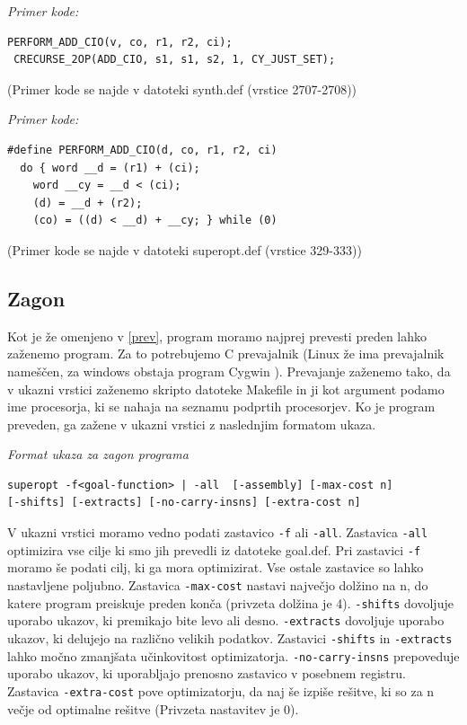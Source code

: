 \documentclass[a4paper, 12pt]{book}
\begin{document}
				\medskip
				
				\noindent
				{\it Primer kode:}
				\begin{Verbatim}[baselinestretch=1]
 PERFORM_ADD_CIO(v, co, r1, r2, ci);
 CRECURSE_2OP(ADD_CIO, s1, s1, s2, 1, CY_JUST_SET);
				\end{Verbatim}
				\noindent
				{\small (Primer kode se najde v datoteki synth.def (vrstice 2707-2708))}
				\medskip
				
				\noindent
{\it Primer kode:}
\begin{Verbatim}[baselinestretch=1]
#define PERFORM_ADD_CIO(d, co, r1, r2, ci) 
  do { word __d = (r1) + (ci);                                          
    word __cy = __d < (ci);                                          
    (d) = __d + (r2);                                                
    (co) = ((d) < __d) + __cy; } while (0)
\end{Verbatim}
%
\noindent
{\small (Primer kode se najde v datoteki superopt.def (vrstice 329-333))}
	 
	\subsection{Zagon}
	Kot je že omenjeno v \ref{prev}, program moramo najprej prevesti preden lahko zaženemo program. Za to potrebujemo C prevajalnik (Linux že ima prevajalnik nameščen, za windows obstaja program Cygwin \cite{cygwin}). Prevajanje zaženemo tako, da v  ukazni vrstici zaženemo skripto datoteke Makefile in ji kot argument podamo ime procesorja, ki se nahaja na seznamu podprtih procesorjev. Ko je program preveden, ga zažene v ukazni vrstici z naslednjim formatom ukaza.
	\medskip
	
	\noindent
	{\it Format ukaza za zagon programa}
\begin{Verbatim}[baselinestretch=1]
superopt -f<goal-function> | -all  [-assembly] [-max-cost n]
[-shifts] [-extracts] [-no-carry-insns] [-extra-cost n]
\end{Verbatim}

	V ukazni vrstici moramo vedno podati zastavico \texttt{-f} ali \texttt{-all}. Zastavica \texttt{-all} optimizira vse cilje ki smo jih prevedli iz datoteke goal.def. Pri zastavici \texttt{-f} moramo še podati cilj, ki ga mora optimizirat. Vse ostale zastavice so lahko nastavljene poljubno. Zastavica \texttt{-max-cost} nastavi največjo dolžino na n, do katere program preiskuje preden konča (privzeta dolžina je 4). \texttt{-shifts} dovoljuje uporabo ukazov, ki premikajo bite levo ali desno. \texttt{-extracts} dovoljuje uporabo ukazov, ki delujejo na različno velikih podatkov. Zastavici \texttt{-shifts} in \texttt{-extracts} lahko močno zmanjšata učinkovitost optimizatorja. \texttt{-no-carry-insns} prepoveduje uporabo ukazov, ki uporabljajo prenosno zastavico v posebnem registru. Zastavica \texttt{-extra-cost} pove optimizatorju, da naj še izpiše rešitve, ki so za n večje od optimalne rešitve (Privzeta nastavitev je 0).
	\medskip
	
\end{document}
